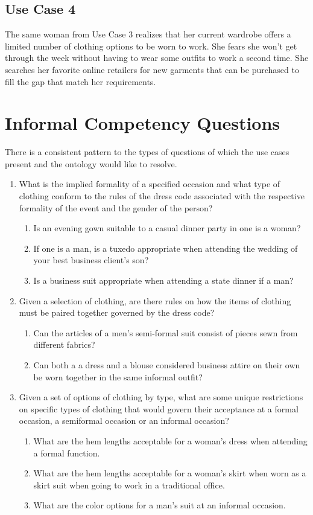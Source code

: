 \documentclass[paper=a4, fontsize=11pt]{scrartcl} %
\numberwithin{equation}{section} %
\numberwithin{figure}{section} %
\numberwithin{table}{section} %
\begin{document}
\subsection{Use Case 4}
The same woman from Use Case 3 realizes that her current wardrobe offers a limited number of clothing options to be worn to work. She fears she won't get through the week without having to wear some outfits to work a second time. She searches her favorite online retailers for new garments that can be purchased to fill the gap that match her requirements.


\section{Informal Competency Questions}
There is a consistent pattern to the types of questions of which the use cases present and the ontology would like to resolve.

\begin{enumerate}
	\item What is the implied formality of a specified occasion and what type of clothing conform to the rules of the dress code associated with the respective formality of the event and the gender of the person?
		\begin{enumerate}[label*=\arabic*.]
			\item Is an evening gown suitable to a casual dinner party in one is a woman?
			\item If one is a man, is a tuxedo appropriate when attending the wedding of your best business client's son?
			\item Is a business suit appropriate when attending a state dinner if a man?
		\end{enumerate}
	\item Given a selection of clothing, are there rules on how the items of clothing must be paired together governed by the dress code?
		\begin{enumerate}[label*=\arabic*.]
			\item Can the articles of a men's semi-formal suit consist of pieces sewn from different fabrics?
			\item Can both a a dress and a blouse considered business attire on their own be worn together in the same informal outfit?
		\end{enumerate}
	\item Given a set of options of clothing by type, what are some unique restrictions on specific types of clothing that would govern their acceptance at a formal occasion, a semiformal occasion or an informal occasion?
	\begin{enumerate}[label*=\arabic*.]
		\item What are the hem lengths acceptable for a woman's dress when attending a formal function.
		\item What are the hem lengths acceptable for a woman's skirt when worn as a skirt suit when going to work in a traditional office.
		\item What are the color options for a man's suit at an informal occasion.
	\end{enumerate}
\end{enumerate}
\end{document}
